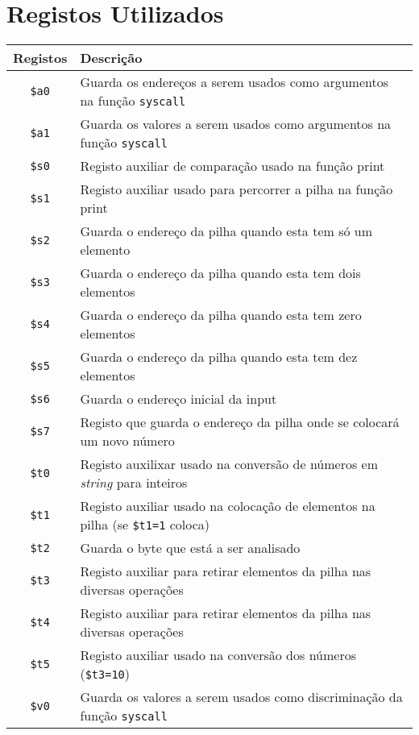 \documentclass[12pt, a4paper]{article}
\begin{document}
    \section{Registos Utilizados}
        \begin{table}[h]
            \centering
            \begin{tabular}{|c|l|}
                \hline
                Registos & Descrição\\ 
                \hline
                \texttt{\$a0} & Guarda os endereços a serem usados como argumentos na função \texttt{syscall}\\
                \texttt{\$a1} & Guarda os valores a serem usados como argumentos na função \texttt{syscall}\\
                \hline
                \texttt{\$s0} & Registo auxiliar de comparação usado na função print\\
                \texttt{\$s1} & Registo auxiliar usado para percorrer a pilha na função print\\
                \texttt{\$s2} & Guarda o endereço da pilha quando esta tem só um elemento\\
                \texttt{\$s3} & Guarda o endereço da pilha quando esta tem dois elementos\\
                \texttt{\$s4} & Guarda o endereço da pilha quando esta tem zero elementos\\
                \texttt{\$s5} & Guarda o endereço da pilha quando esta tem dez elementos\\
                \texttt{\$s6} & Guarda o endereço inicial da input\\
                \texttt{\$s7} & Registo que guarda o endereço da pilha onde se colocará um novo número\\
                \hline
                \texttt{\$t0} & Registo auxilixar usado na conversão de números em \textit{string} para inteiros\\
                \texttt{\$t1} & Registo auxiliar usado na colocação de elementos na pilha (se \texttt{\$t1=1} coloca)\\
                \texttt{\$t2} & Guarda o byte que está a ser analisado\\
                \texttt{\$t3} & Registo auxiliar para retirar elementos da pilha nas diversas operações\\
                \texttt{\$t4} & Registo auxiliar para retirar elementos da pilha nas diversas operações\\
                \texttt{\$t5} & Registo auxiliar usado na conversão dos números (\texttt{\$t3=10})\\
                \hline
                \texttt{\$v0} & Guarda os valores a serem usados como discriminação da função \texttt{syscall}\\
                \hline
            \end{tabular}
        \end{table}
        
\end{document}
